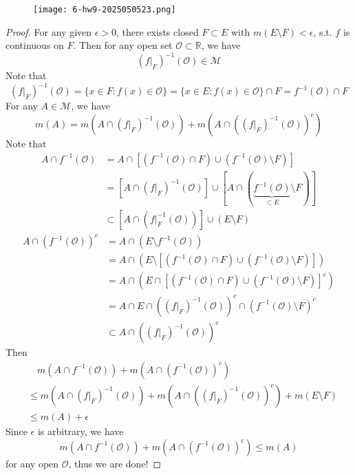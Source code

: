 \begin{exercise}
\begin{figure}[H]
\centering
\texttt{[image: 6-hw9-2025050523.png]}
\label{}
\end{figure}
\end{exercise}
\begin{proof}
For any given $\epsilon>0$, there exists closed $F\subset E$ with $m(E\setminus F)<\epsilon$, s.t. $f$ is continuous on $F$. Then for any open set $\mathcal{O}\subset \mathbb{R}$, we have
\[
(f|_{F})^{-1}(\mathcal{O})\in \mathcal{M}
\]
Note that
\[
(f|_{F})^{-1}(\mathcal{O})=\{ x\in F:f(x)\in \mathcal{O} \}=\{ x\in E:f(x)\in \mathcal{O} \}\cap F=f^{-1}(\mathcal{O})\cap F
\]
For any $A\in \mathcal{M}$, we have
\[
m(A)=m(A\cap(f|_{F})^{-1}(\mathcal{O}))+m(A\cap((f|_{F})^{-1}(\mathcal{O}))^{c})
\]
Note that
\[
\begin{aligned}
A\cap f^{-1}(\mathcal{O}) & =A\cap[(f^{-1}(\mathcal{O})\cap F)\cup(f^{-1}(\mathcal{O})\setminus F)] \\
 & =[A\cap(f|_{F})^{-1}(\mathcal{O})]\cup[A\cap(\underbrace{ f^{-1}(\mathcal{O}) }_{ \subset E }\setminus F)] \\
 & \subset[A\cap(f|_{F}^{-1}(\mathcal{O}))]\cup(E\setminus F)
\end{aligned}
\]
\[
\begin{aligned}
A\cap(f^{-1}(\mathcal{O}))^{c} & =A\cap(E\setminus f^{-1}(\mathcal{O})) \\
 & =A\cap(E\setminus [(f^{-1}(\mathcal{O})\cap F)\cup(f^{-1}(\mathcal{O})\setminus F)]) \\
 & =A\cap(E\cap[(f^{-1}(\mathcal{O})\cap F)\cup(f^{-1}(\mathcal{O})\setminus F)]^{c} ) \\
 & =A\cap E\cap((f|_{F})^{-1}(\mathcal{O}))^{c}\cap(f^{-1}(\mathcal{O})\setminus F)^{c} \\
 & \subset A\cap((f|_{F})^{-1}(\mathcal{O}))^{c}
\end{aligned}
\]
Then
\[
\begin{aligned}
 & \quad m(A\cap f^{-1}(\mathcal{O}))+m(A\cap(f^{-1}(\mathcal{O}))^{c})  \\
 & \leq m(A\cap(f|_{F})^{-1}(\mathcal{O}))+m(A\cap((f|_{F})^{-1}(\mathcal{O}))^{c})+m(E\setminus F) \\
 & \leq m(A)+\epsilon
\end{aligned}
\]
Since $\epsilon$ is arbitrary, we have
\[
m(A\cap f^{-1}(\mathcal{O}))+m(A\cap(f^{-1}(\mathcal{O}))^{c})\leq m(A)
\]
for any open $\mathcal{O}$, thus we are done!

\end{proof}

